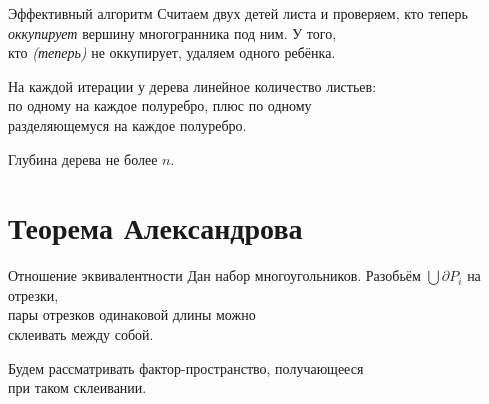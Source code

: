 \documentclass[12pt,aspectratio=169,svgnames]{beamer}
\begin{document}
\begin{frame}{Эффективный алгоритм}
	Считаем двух детей листа и проверяем, кто теперь\\
	{\it оккупирует} вершину многогранника под ним. У того,\\
	кто {\it (теперь)} не оккупирует, удаляем одного ребёнка.

	На каждой итерации у дерева линейное количество листьев:\\
	по одному на каждое полуребро, плюс по одному \\
	разделяющемуся на каждое полуребро.

	Глубина дерева \alert{не более \(n\).}
\end{frame}


\section{Теорема Александрова}

\begin{frame}{Отношение эквивалентности}
	Дан набор многоугольников. Разобьём \(\bigcup \partial P_i\) на отрезки,\\
	пары отрезков одинаковой длины можно\\
	склеивать между собой.

	Будем рассматривать \alert{фактор-пространство,} получающееся\\
	при таком склеивании.
\end{frame}
\end{document}
